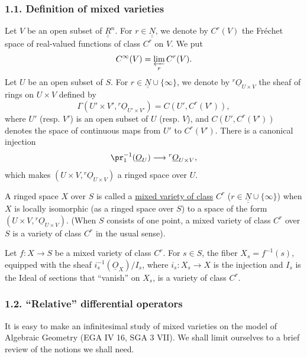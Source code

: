 \subsubsection*{1.1. Definition of mixed varieties}
Let $V$ be an open subset of $\underline{\underline{R}}^n$. For $r\in\underline{\underline{N}}$, we denote by $C^r(V)$ the Fréchet space of real-valued functions of class $C^r$ on $V$. We put
\[
  C^\infty(V)=\varprojlim_r C^r(V).
\]
Let $U$ be an open subset of $S$. For $r\in\underline{\underline{N}}\cup\{\infty\}$, we denote by ${}^r\underline{O}_{U\times V}$ the sheaf of rings on $U\times V$ defined by
%
\[
  \Gamma(U'\times V',{}^r\underline{O}_{U'\times V'})=C(U',C^r(V')),
\]
where $U'$ (resp. $V'$) is an open subset of $U$ (resp. $V$), and $C(U',C^r(V'))$ denotes the space of continuous maps from $U'$ to $C^r(V')$. There is a canonical injection
\[
  \pr_1^{-1}(\underline{O}_U)\longrightarrow{}^r\underline{O}_{U\times V},
\]
which makes $(U\times V,{}^r\underline{O}_{U\times V})$ a ringed space over $U$.

A ringed space $X$ over $S$ is called a \uline{mixed variety of class} $C^r$ ($r\in\underline{\underline{N}}\cup\{\infty\}$) when $X$ is locally isomorphic (as a ringed space over $S$) to a space of the form $(U\times V,{}^r\underline{O}_{U\times V})$. (When $S$ consists of one point, a mixed variety of class $C^r$ over $S$ is a variety of class $C^r$ in the usual sense).

Let $f:X\to S$ be a mixed variety of class $C^r$. For $s\in S$, the fiber $X_s=f^{-1}(s)$, equipped with the sheaf $i_s^{-1}(\underline{O}_X)/I_s$, where $i_s:X_s\to X$ is the injection and $I_s$ is the Ideal of sections that \textquotedblleft vanish\textquotedblright{} on $X_s$, is a variety of class $C^r$.

\subsubsection*{1.2. \textquotedblleft Relative\textquotedblright{} differential operators}
It is easy to make an infinitesimal study of mixed varieties on the model of Algebraic Geometry (EGA IV 16, SGA 3 VII). We shall limit ourselves to a brief review of the notions we shall need.

